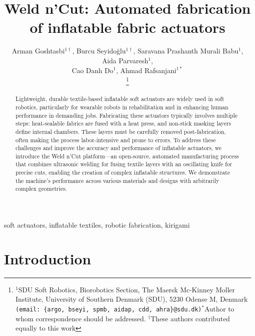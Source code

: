 \documentclass[journal, letterpaper]{IEEEtran}
\begin{document}
	\title{Weld n'Cut: Automated fabrication of inflatable fabric actuators }


\author{Arman Goshtasbi$^{1\dagger}$, Burcu Seyidoğlu$^{1\dagger}$,  Saravana Prashanth Murali Babu$^{1}$, Aida Parvaresh$^{1}$,\\  Cao Danh Do$^{1}$, Ahmad Rafsanjani$^{1*}$

\thanks{$^{1}$SDU Soft Robotics, Biorobotics Section, The Maersk Mc-Kinney Moller Institute, University of Southern Denmark (SDU), 5230 Odense M, Denmark
        {\tt\small (email: \{argo, bseyi, spmb, aidap, cdd, ahra\}@sdu.dk)}\newline$^{*}$Author to whom correspondence should be addressed.
        \newline$^{\dagger}$These authors contributed equally to this work} 
}
	\markboth{}{}
	\maketitle
    
\begin{abstract}
Lightweight, durable textile-based inflatable soft actuators are widely used in soft robotics, particularly for wearable robots in rehabilitation and in enhancing human performance in demanding jobs. Fabricating these actuators typically involves multiple steps: heat-sealable fabrics are fused with a heat press, and non-stick masking layers define internal chambers. These layers must be carefully removed post-fabrication, often making the process labor-intensive and prone to errors. To address these challenges and improve the accuracy and performance of inflatable actuators, we introduce the Weld n'Cut platform—an open-source, automated manufacturing process that combines ultrasonic welding for fusing textile layers with an oscillating knife for precise cuts, enabling the creation of complex inflatable structures. We demonstrate the machine’s performance across various materials and designs with arbitrarily complex geometries.
\end{abstract}

\begin{IEEEkeywords}
soft actuators, inflatable textiles, robotic fabrication, kirigami
\end{IEEEkeywords}

\section{Introduction}
\end{document}
